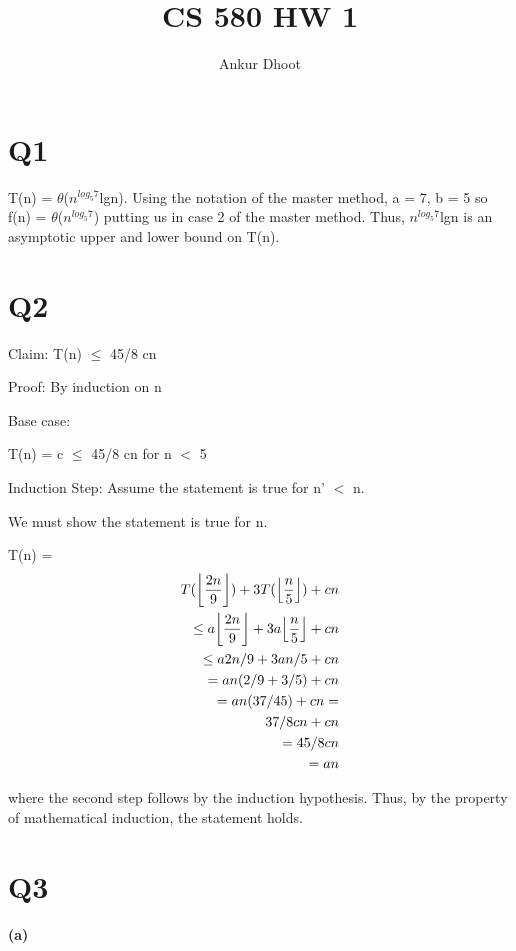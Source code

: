 \documentclass[11pt,a4paper]{article}
\DeclarePairedDelimiter\floor{\lfloor}{\rfloor}
\begin{document}
\author{Ankur Dhoot}
\title{CS 580 HW 1}
\maketitle

\section*{Q1}

T(n) = $\theta$($n^{log_5 7}$lgn). Using the notation of the master method, a = 7, b = 5 so f(n) = $\theta$($n^{log_5 7}$) putting us in case 2 of the master method. Thus, $n^{log_5 7}$lgn is an asymptotic upper and lower bound on T(n).

\section*{Q2}
Claim: T(n) $\leq$ 45/8 cn

Proof: By induction on n

Base case: 

T(n) = c $\leq$ 45/8 cn for n $<$ 5

Induction Step: Assume the statement is true for n' $<$ n.

We must show the statement is true for n. 

T(n) = 
\begin{equation}
	\begin{aligned}
    T(\floor*{\frac{2n}{9}}) + 3T(\floor*{\frac{n}{5}}) + cn \\ 
    \leq a\floor*{\frac{2n}{9}} + 3a\floor*{\frac{n}{5}} + cn \\
    \leq a2n/9 + 3an/5 + cn \\
    = an(2/9 + 3/5) + cn \\
    = an(37/45) + cn = \\
    37/8cn + cn \\
    = 45/8cn \\
    = an
	\end{aligned}
\end{equation}

where the second step follows by the induction hypothesis. Thus, by the property of mathematical induction, the statement holds.

\section*{Q3}

\paragraph*{(a)}
\end{document}
